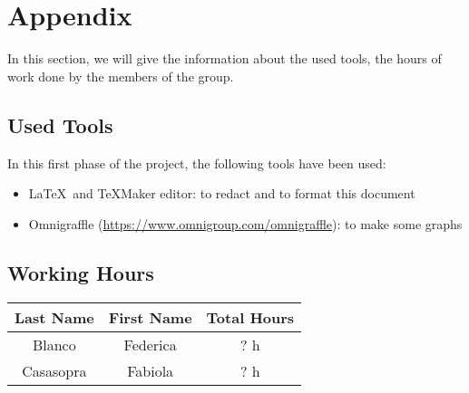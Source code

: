 \section{Appendix} \label{sec:appendix}

In this section, we will give the information about the used tools, the hours of work done by the members of the group.

\subsection{Used Tools} \label{tools}

In this first phase of the project, the following tools have been used:

\begin{itemize}
	\item \LaTeX\ and TeXMaker editor: to redact and to format this document
	\item Omnigraffle (\url{https://www.omnigroup.com/omnigraffle}): to make some graphs
\end{itemize}

\subsection{Working Hours} \label{worked}

\begin{table}[htbp]
\begin{center}
\begin{tabular}[t]{ccc}

\hline
\textbf{Last Name} & \textbf{First Name} & \textbf{Total Hours} \\
\hline
Blanco & Federica &  ? h\\
\hline
Casasopra & Fabiola &  ? h\\
\hline

\end{tabular}
\end{center}
\end{table}


